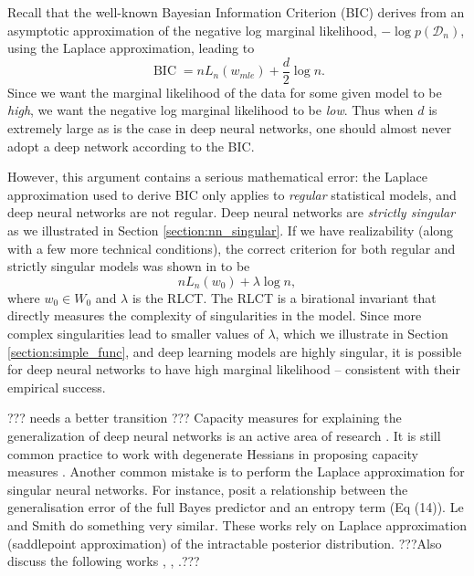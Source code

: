 \documentclass{article} %
\begin{document}
Recall that the well-known Bayesian Information Criterion (BIC) derives from an asymptotic approximation of the negative log marginal likelihood, $-\log p(\mathcal D_n)$, using the Laplace approximation, leading to
\[
\operatorname{BIC} = nL_n( w_{mle}) + \frac{d}{2} \log n.
\]
Since we want the marginal likelihood of the data for some given model to be \textit{high}, we want the negative log marginal likelihood to be \textit{low}. Thus when $d$ is extremely large as is the case in deep neural networks, one should almost never adopt a deep network according to the BIC. 

However, this argument contains a serious mathematical error: the Laplace approximation used to derive BIC only applies to \emph{regular} statistical models, and deep neural networks are not regular. Deep neural networks are \textit{strictly singular} as we illustrated in Section \ref{section:nn_singular}. 
If we have realizability (along with a few more technical conditions), the correct criterion for both regular and strictly singular models was shown in \citet{watanabe_widely_2013} to be 
\begin{equation}
nL_n(w_0) + \lambda \log n,
\label{logmarginal_rlct}
\end{equation}
where $w_0 \in W_0$ and $\lambda$ is the RLCT. 
The RLCT is a birational invariant \citep{kollar_birational_1998} that directly measures the complexity of singularities in the model. Since more complex singularities lead to smaller values of $\lambda$, which we illustrate in Section \ref{section:simple_func}, and deep learning models are highly singular, it is possible for deep neural networks to have high marginal likelihood -- consistent with their empirical success. 


??? needs a better transition ???
Capacity measures for explaining the generalization of deep neural networks is an active area of research \cite{neyshabur_exploring_2017}. It is still common practice to work with degenerate Hessians in proposing capacity measures \cite{thomas_information_2019}. Another common mistake is to perform the Laplace approximation for singular neural networks. For instance, \citet{zhang_energyentropy_2018} posit a relationship between the generalisation error of the full Bayes predictor and an entropy term (Eq (14)). Le and Smith \cite{le_bayesian_2018} do something very similar. These works rely on Laplace approximation (saddlepoint approximation) of the intractable posterior distribution. ???Also discuss the following works \cite{maddox_rethinking_2020}, \cite{gao_degrees_2016}, \cite{sun_lightlike_2020}.???
\end{document}
